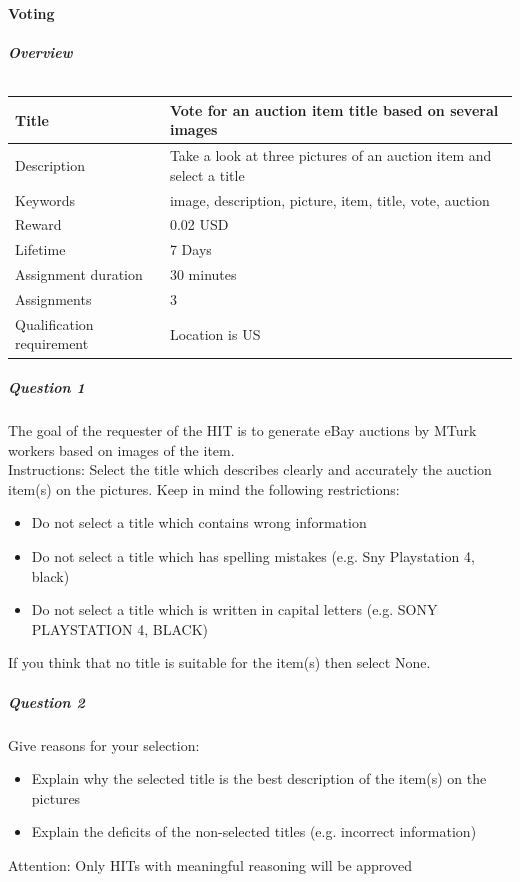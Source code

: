 \paragraph{Voting}
\subparagraph{Overview}
\begin{table}[h!]
	\begin{center}
	\begin{tabular}{| l | p{10cm} |}
		\hline
		Title & Vote for an auction item title based on several images \\
		\hline
		Description & Take a look at three pictures of an auction item and select a title \\
		\hline
		Keywords & image, description, picture, item, title, vote, auction \\
		\hline
		Reward & 0.02 USD \\
		\hline
		Lifetime & 7 Days \\
		\hline
		Assignment duration & 30 minutes \\
		\hline
		Assignments & 3 \\
		\hline
		Qualification requirement & Location is US \\
		\hline
	\end{tabular}
	\end{center}
	\caption{}
\end{table}
\subparagraph{Question 1}
The goal of the requester of the HIT is to generate eBay auctions by MTurk workers based on images of the item.\\
Instructions: Select the title which describes clearly and accurately the auction item(s) on the pictures. Keep in mind the following restrictions:
\begin{itemize}
	\item Do not select a title which contains wrong information
	\item Do not select a title which has spelling mistakes (e.g. Sny Playstation 4, black)
	\item Do not select a title which is written in capital letters (e.g. SONY PLAYSTATION 4, BLACK)
\end{itemize}
If you think that no title is suitable for the item(s) then select None. 
\subparagraph{Question 2}
Give reasons for your selection:
\begin{itemize}
	\item Explain why the selected title is the best description of the item(s) on the pictures
	\item Explain the deficits of the non-selected titles (e.g. incorrect information)
\end{itemize}
Attention: Only HITs with meaningful reasoning will be approved 
